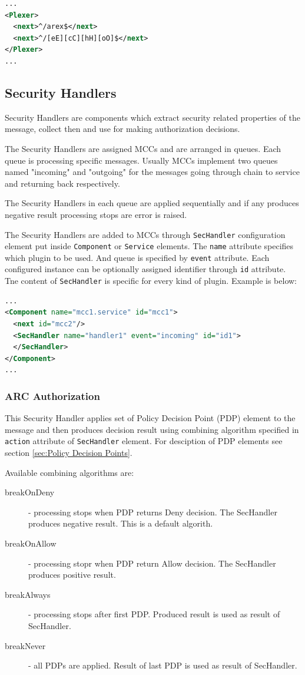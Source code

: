 \documentclass{article}
\begin{document}
\begin{lstlisting}[language=xml]
...
<Plexer>
  <next>^/arex$</next>
  <next>^/[eE][cC][hH][oO]$</next>
</Plexer>
...
\end{lstlisting}

\subsection{Security Handlers}\label{sec:Security Handlers}
Security Handlers are components which extract security related properties of
the message, collect then and use for making authorization decisions.

The Security Handlers are assigned MCCs and are arranged in queues. Each queue
is processing specific messages. Usually MCCs implement two queues named 
"incoming" and "outgoing" for the messages going through chain to service
and returning back respectively.

The Security Handlers in each queue are applied sequentially and if any
produces negative result processing stops are error is raised.

The Security Handlers are added to MCCs through \texttt{SecHandler} configuration
element put inside \texttt{Component} or \texttt{Service} elements. The
\texttt{name} attribute specifies which plugin to be used. And queue is 
specified by \texttt{event} attribute. Each configured instance can be 
optionally assigned identifier through \texttt{id} attribute. Tne content
of \texttt{SecHandler} is specific for every kind of plugin.
Example is below:
\begin{lstlisting}[language=xml]
...
<Component name="mcc1.service" id="mcc1">
  <next id="mcc2"/>
  <SecHandler name="handler1" event="incoming" id="id1">
  </SecHandler>
</Component>
...
\end{lstlisting}


\subsubsection{ARC Authorization}\label{sec:arcautz-shc}
This Security Handler applies set of Policy Decision Point (PDP) element to the
message and then produces decision result using combining algorithm specified in 
\texttt{action} attribute of \texttt{SecHandler} element. For desciption of PDP
elements see section \ref{sec:Policy Decision Points}.

Available combining algorithms are:
\begin{description}
\item[breakOnDeny] - processing stops when PDP returns Deny decision. The SecHandler
produces negative result. This is a default algorith.
\item[breakOnAllow] - processing stopr when PDP return Allow decision. The SecHandler
produces positive result.
\item[breakAlways] - processing stops after first PDP. Produced result is used as
result of SecHandler.
\item[breakNever] - all PDPs are applied. Result of last PDP is used as result of 
SecHandler.
\end{description}
\end{document}
